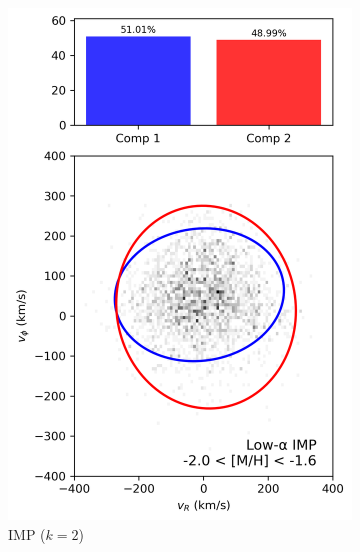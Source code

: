 \documentclass[a4paper,12pt]{article}
\begin{document}
\begin{figure}[H]
\begin{subfigure}{0.24\linewidth}
    \includegraphics[width=\linewidth]{../figures/gmm_imp_low_alpha_k2.png}
    \caption{IMP ($k{=}2$)}
    \label{fig:gmm_imp_lo}
  \end{subfigure}\hfill
  \begin{subfigure}{0.24\linewidth}
    \centering

\end{subfigure}
\end{figure}
\end{document}
